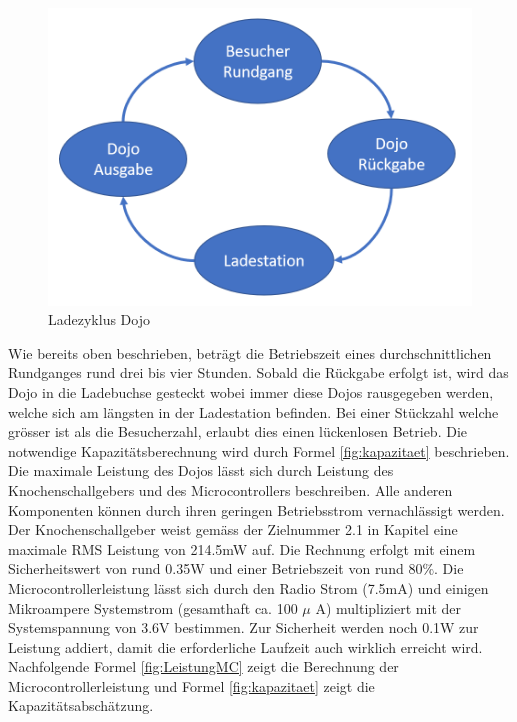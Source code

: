 \begin{figure}[H]
	\begin{center}
		\includegraphics[width=120mm]{data/LadezyklusDojo.png}
		\caption{Ladezyklus Dojo} %
		\label{fig:Ladezyklus Dojo}
	\end{center}
\end{figure}

Wie bereits oben beschrieben, beträgt die Betriebszeit eines durchschnittlichen Rundganges rund drei bis vier Stunden. Sobald die Rückgabe erfolgt ist, wird das Dojo in die Ladebuchse gesteckt wobei immer diese Dojos rausgegeben werden, welche sich am längsten in der Ladestation befinden. Bei einer Stückzahl welche grösser ist als die Besucherzahl, erlaubt dies einen lückenlosen Betrieb.
Die notwendige Kapazitätsberechnung wird durch Formel \ref{fig:kapazitaet} beschrieben. Die maximale Leistung des Dojos lässt sich durch Leistung des Knochenschallgebers und des Microcontrollers beschreiben. Alle anderen Komponenten können durch ihren geringen Betriebsstrom vernachlässigt werden. Der Knochenschallgeber weist gemäss der Zielnummer 2.1 in Kapitel \pageref{Projektziele} eine maximale RMS Leistung von 214.5mW auf. Die Rechnung erfolgt mit einem Sicherheitswert von rund 0.35W und einer Betriebszeit von rund 80$\%$. Die Microcontrollerleistung lässt sich durch den Radio Strom (7.5mA) und einigen Mikroampere Systemstrom (gesamthaft ca. 100 $\mu$ A) multipliziert mit der Systemspannung von 3.6V bestimmen. Zur Sicherheit werden noch 0.1W zur Leistung addiert, damit die erforderliche Laufzeit auch wirklich erreicht wird. Nachfolgende Formel \ref{fig:LeistungMC} zeigt die Berechnung der Microcontrollerleistung und Formel \ref{fig:kapazitaet} zeigt die Kapazitätsabschätzung.

